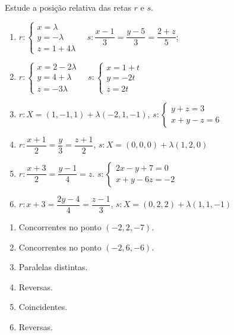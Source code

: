 \documentclass[12pt]{exam}
\begin{document}
\begin{exercicio}
    Estude a posição relativa das retas $r$ e $s$.
    \begin{enumerate}[label=({\alph*})]
        \item $r: \begin{cases}
                      x = \lambda   \\
                      y = - \lambda \\
                      z = 1 + 4\lambda
                  \end{cases} \quad s: \dfrac{x - 1}{3} = \dfrac{y - 5}{3} = \dfrac{2 + z}{5}$;
        \item $r: \begin{cases}
                      x = 2 - 2\lambda \\
                      y = 4 + \lambda  \\
                      z = -3\lambda
                  \end{cases}\quad s: \begin{cases}
                      x = 1 + t \\
                      y = -2t   \\
                      z = 2t
                  \end{cases}$
        \item $r : X = (1,-1,1) + \lambda(-2,1,-1)$, $s : \begin{cases}
                      y + z = 3 \\
                      x + y - z = 6
                  \end{cases}$
        \item $r : \dfrac{x + 1}{2} = \dfrac{y}{3} = \dfrac{z + 1}{2}$, $s : X = (0,0,0) + \lambda(1,2,0)$
        \item $r : \dfrac{x + 3}{2} = \dfrac{y - 1}{4} = z$. $s : \begin{cases}
                      2x - y + 7 = 0 \\
                      x + y - 6z = -2
                  \end{cases}$
        \item $r : x + 3 = \dfrac{2y - 4}{4} = \dfrac{z - 1}{3}$, $s : X = (0,2,2) + \lambda(1,1,-1)$
    \end{enumerate}
    \begin{solucao}
        \begin{enumerate}[label=({\alph*})]
            \item Concorrentes no ponto $(-2,2,-7)$.
            \item Concorrentes no ponto $(-2,6,-6)$.
            \item Paralelas distintas.
            \item Reversas.
            \item Coincidentes.
            \item Reversas.
        \end{enumerate}
    \end{solucao}
\end{exercicio}
\end{document}
